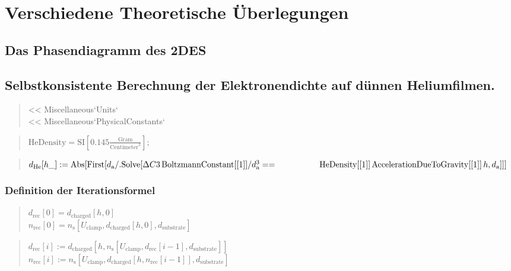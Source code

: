 \section{Verschiedene Theoretische Überlegungen}
\subsection{Das Phasendiagramm des 2DES}
\subsection{Selbstkonsistente Berechnung der Elektronendichte auf dünnen Heliumfilmen.}

\begin{quote}
<< Miscellaneous`Units`\\
<< Miscellaneous`PhysicalConstants`
\end{quote}

\begin{quote}
$\text{HeDensity} = \text{SI}[0.145  \frac{\text{Gram}}{\text{Centimeter}^3}];$
\end{quote}

\begin{quote}
$d_\text{He}[h\_] := \text{Abs}[\text{First}[d_\text{a} /. \text{Solve}[\Delta C3 \,\text{BoltzmannConstant}[[1]]/d_\text{a}^3 == \\\phantom{d_\text{He}[h\_] :=~ }\text{HeDensity}[[1]]\,
          \text{AccelerationDueToGravity}[[1]]\,h, d_\text{a}]]]$
\end{quote}
\subsubsection{Definition der Iterationsformel}
\begin{quote}
$d_\text{rec}[0] = d_\text{charged}[h, 0]$\\
  $n_\text{rec}[0] = n_\text{s}[U_\text{clamp}, d_\text{charged}[h, 0], d_\text{substrate}]$
\end{quote}

\begin{quote}
$d_\text{rec}[i] := d_\text{charged}[
    h, n_\text{s}[U_\text{clamp}, d_\text{rec}[i - 1], d_\text{substrate}]]$\\
	$n_\text{rec}[i] := n_\text{s}[U_\text{clamp}, d_\text{charged}[h, n_\text{rec}[i - 1]], d_\text{substrate}]$
\end{quote}
